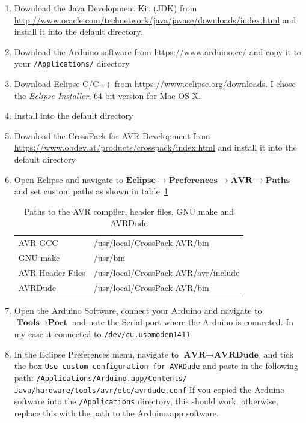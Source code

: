 \documentclass[11pt,a4paper,titlepage]{article}
\begin{document}
\begin{enumerate}
	\item
	Download the Java Development Kit (JDK) from \url{http://www.oracle.com/technetwork/java/javase/downloads/index.html} and install it into the default directory.
	
	\item
	Download the Arduino software from \url{https://www.arduino.cc/} and copy it to your \verb|/Applications/| directory
	
	\item
	Download Eclipse C/C++ from \url{https://www.eclipse.org/downloads}. I  chose the \textit{Eclipse Installer}, 64 bit version for Mac OS X.
	
	\item
	Install into the default directory
	
	\item
	Download the CrossPack for AVR Development from \url{https://www.obdev.at/products/crosspack/index.html} and install it into the default directory
	
	\item
	Open Eclipse and navigate to $\textbf{Eclipse} \rightarrow \textbf{Preferences} \rightarrow \textbf{AVR} \rightarrow \textbf{Paths}$ and set custom paths as shown in table~\ref{tab:paths}
	
	\begin{table}[h]
		\centering
		\begin{tabular}{ll}
			\toprule
				AVR-GCC		&	/usr/local/CrossPack-AVR/bin\\
				GNU make	&	/usr/bin\\
				AVR Header Files	&	/usr/local/CrossPack-AVR/avr/include\\
				AVRDude	&		/usr/local/CrossPack-AVR/bin\\
			\bottomrule
		\end{tabular}
		\caption{Paths to the AVR compiler, header files, GNU make and AVRDude}
		\label{tab:paths}
	\end{table}

	\item
	\label{item:port}
	Open the Arduino Software, connect your Arduino and navigate to $\textbf{Tools} \rightarrow \textbf{Port}$ and note the Serial port where the Arduino is connected. In my case it connected to \verb|/dev/cu.usbmodem1411|
	
	\item
	In the Eclipse Preferences menu, navigate to $\textbf{AVR} \rightarrow \textbf{AVRDude}$ and tick the box \verb|Use custom configuration for AVRDude| and paste in the following path:
	 \verb|/Applications/Arduino.app/Contents/| \verb|Java/hardware/tools/avr/etc/avrdude.conf|
	If you copied the Arduino software into the \verb|/Applications| directory, this should work, otherwise, replace this with the path to the Arduino.app software.


\end{enumerate}
\end{document}
